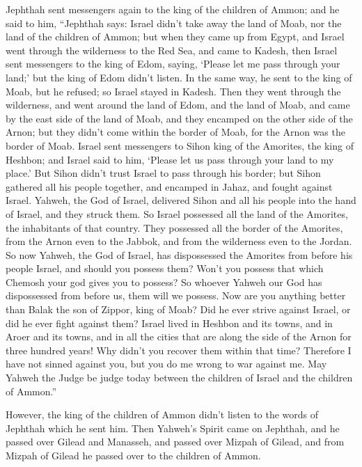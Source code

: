  Jephthah sent messengers again to the king of the children
of Ammon;  and he said to him, ``Jephthah says: Israel
didn't take away the land of Moab, nor the land of the children of
Ammon;  but when they came up from Egypt, and Israel went
through the wilderness to the Red Sea, and came to Kadesh, 
then Israel sent messengers to the king of Edom, saying, `Please let me
pass through your land;' but the king of Edom didn't listen. In the same
way, he sent to the king of Moab, but he refused; so Israel stayed in
Kadesh.  Then they went through the wilderness, and went
around the land of Edom, and the land of Moab, and came by the east side
of the land of Moab, and they encamped on the other side of the Arnon;
but they didn't come within the border of Moab, for the Arnon was the
border of Moab.  Israel sent messengers to Sihon king of
the Amorites, the king of Heshbon; and Israel said to him, `Please let
us pass through your land to my place.'  But Sihon didn't
trust Israel to pass through his border; but Sihon gathered all his
people together, and encamped in Jahaz, and fought against Israel.
 Yahweh, the God of Israel, delivered Sihon and all his
people into the hand of Israel, and they struck them. So Israel
possessed all the land of the Amorites, the inhabitants of that country.
 They possessed all the border of the Amorites, from the
Arnon even to the Jabbok, and from the wilderness even to the Jordan.
 So now Yahweh, the God of Israel, has dispossessed the
Amorites from before his people Israel, and should you possess them?
 Won't you possess that which Chemosh your god gives you to
possess? So whoever Yahweh our God has dispossessed from before us, them
will we possess.  Now are you anything better than Balak
the son of Zippor, king of Moab? Did he ever strive against Israel, or
did he ever fight against them?  Israel lived in Heshbon
and its towns, and in Aroer and its towns, and in all the cities that
are along the side of the Arnon for three hundred years! Why didn't you
recover them within that time?  Therefore I have not sinned
against you, but you do me wrong to war against me. May Yahweh the Judge
be judge today between the children of Israel and the children of
Ammon.''

 However, the king of the children of Ammon didn't listen
to the words of Jephthah which he sent him.  Then Yahweh's
Spirit came on Jephthah, and he passed over Gilead and Manasseh, and
passed over Mizpah of Gilead, and from Mizpah of Gilead he passed over
to the children of Ammon.

